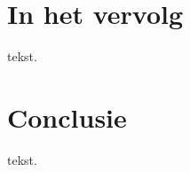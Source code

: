 \documentclass[a4paper,kul]{kulakarticle} %
\begin{document}
\newpage

\section{In het vervolg}

tekst.

\newpage

\section{Conclusie}

tekst.

\newpage






\end{document}
